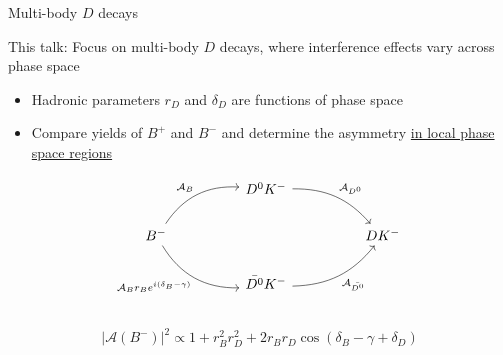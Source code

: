 \documentclass{beamer}
\begin{document}
\begin{frame}[fragile]{Multi-body $D$ decays}
  \begin{center}
    This talk: Focus on multi-body $D$ decays, where interference effects vary across phase space
  \end{center}
  \begin{itemize}
    \setlength\itemsep{0.5em}
    \item{Hadronic parameters $r_D$ and $\delta_D$ are functions of phase space}
    \item{Compare yields of $B^+$ and $B^-$ and determine the asymmetry \underline{in local phase space regions}}
  \end{itemize}
  \begin{equation*}
    \begin{tikzcd}[column sep=huge]
      & D^0K^- \arrow[dr, bend left = 25, "\mathcal{A}_{D^0}"] & \\
      B^- \arrow[ur, bend left, "\mathcal{A}_B"] \arrow[dr, bend right, "\mathcal{A}_B r_B e^{i(\delta_B - \gamma)}"'] & [5cm] & DK^- \\
      & \bar{D^0}K^- \arrow[ur, bend right = 25, "\mathcal{A}_{\bar{D^0}}"'] & \\
    \end{tikzcd}
  \end{equation*}
  \vspace{-0.7cm}
  \begin{equation*}
    \lvert\mathcal{A}(B^-)\lvert^2\propto1 + r_B^2r_D^2 + 2r_Br_D\cos(\delta_B - \gamma + \delta_D)
  \end{equation*}
\end{frame}
\end{document}
